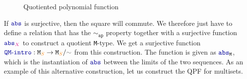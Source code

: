 \documentclass[twoside,11pt,openright]{report}
\theoremstyle{plain} %
\theoremstyle{definition}
\theoremstyle{remark}
\newcommand*{\type}[1]{\textcolor{magenta!90!black}{#1}}
\newcommand*{\container}[1]{\textcolor{orange}{#1}}
\newcommand*{\relation}[1]{\textcolor{gray!75!black}{\ensuremath{\mathtt{#1}}}}
\newcommand*{\function}[1]{\textcolor{blue!60!black}{\ensuremath{\mathtt{#1}}}}
\newcommand*{\typeformer}[1]{\ensuremath{\mathtt{#1}}}
\newcommand*{\functor}[1]{\ensuremath{\mathbf{\mathtt{#1}}}}
\begin{document}
\begin{figure}[h]
  \centering
  \caption{Quotiented polynomial function}
  \label{fig:QPF-diagram}
\end{figure}
If \(\function{abs}\) is surjective, then the square will commute. We therefore just have to define a relation that has the \function{\sim_{ap}} property together with a surjective function \(\function{abs}_{\type{X}}\) to construct a quotient \texttt{M}-type. We get a surjective function \(\function{QM\text{-}intro} : \typeformer{M}_{\container{S}} \rightarrow \typeformer{M}_{\container{S}} / \relation{\sim}\) from this construction. The function is given as \(\function{abs}_{\typeformer{M}}\), which is the instantiation of \(\function{abs}\) between the limits of the two sequences. As an example of this alternative construction, let us construct the QPF for multisets.
\end{document}

